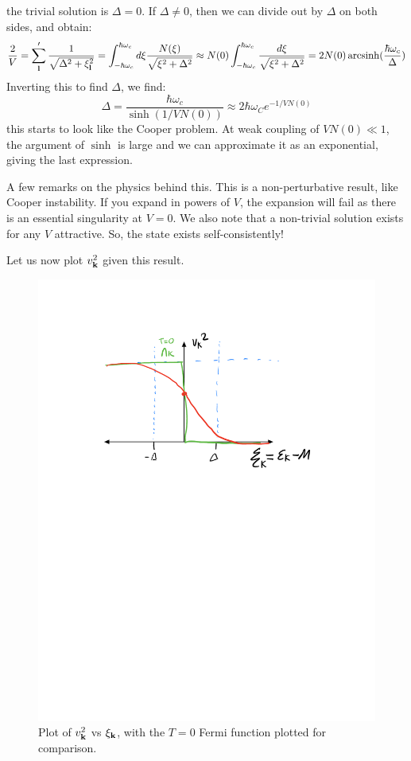 the trivial solution is $\Delta = 0$. If $\Delta \neq 0$, then we can divide out by $\Delta$ on both sides, and obtain:
\begin{align*}
    \frac{2}{V} = \sum_{\mathbf{l}}' \frac{1}{\sqrt{\Delta^2 + \xi_{\mathbf{l}}^2}} = \int_{-\hbar\omega_c}^{\hbar\omega_c} d\xi \frac{N(\xi)}{\sqrt{\xi^2 + \Delta^2}} \approx N(0)\int_{-\hbar\omega_c}^{\hbar\omega_c} \frac{d\xi}{\sqrt{\xi^2 + \Delta^2}} = 2N(0)\operatorname{arcsinh}(\frac{\hbar\omega_c}{\Delta})
\end{align*}
Inverting this to find $\Delta$, we find:
\begin{equation}
    \Delta = \frac{\hbar\omega_c}{\sinh(1/VN(0))}\approx 2\hbar \omega_C e^{-1/VN(0)}
\end{equation}
this starts to look like the Cooper problem. At weak coupling of $VN(0) \ll 1$, the argument of $\sinh$ is large and we can approximate it as an exponential, giving the last expression.

A few remarks on the physics behind this. This is a non-perturbative result, like Cooper instability. If you expand in powers of $V$, the expansion will fail as there is an essential singularity at $V = 0$. We also note that a non-trivial solution exists for any $V$ attractive. So, the state exists self-consistently!

Let us now plot $v_{\mathbf{k}}^2$ given this result.

\begin{figure}[htbp]
    \centering
    \includegraphics[scale=0.7]{Images/fig-vksquareplotbcs.pdf}
    \caption{Plot of $v_{\mathbf{k}}^2$ vs $\xi_{\mathbf{k}}$, with the $T = 0$ Fermi function plotted for comparison.}
    \label{fig-vksquareplotbcs}
\end{figure}

